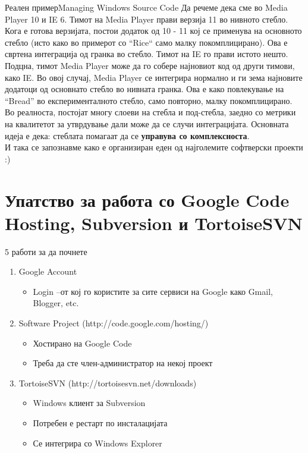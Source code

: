 \begin{frame}[shrink=10]{Реален пример}{Managing Windows Source Code}
Да речеме дека сме во Media Player 10 и IE 6. Тимот на Media Player прави
верзија 11 во нивното стебло. Кога е готова верзијата, постои додаток од 10 - 11
кој се применува на основното стебло (исто како во примерот со “Rice“ само
малку покомплицирано). Ова е свртена интеграција од гранка во стебло. Тимот на
IE го прави истото нешто.
\linebreak
Подцна, тимот Media Player може да го собере најновиот код од други тимови, како
IE. Во овој случај, Media Player се интегрира нормално и ги зема најновите
додатоци од основнато стебло во нивната гранка. Ова е како повлекување на
“Bread” во експерименталното стебло, само повторно, малку покомплицирано.
\linebreak
Во реалноста, постојат многу слоеви на стебла и под-стебла, заедно со метрики на
квалитетот за утврдување дали може да се случи интеграцијата.
Основната идеја е дека: стеблата помагаат да се \textbf{управува со
комплексноста}.\\
И така се запознавме како е организиран еден од најголемите софтверски
 проекти :)
\end{frame}

\section{Упатство за работа со Google Code Hosting, Subversion и TortoiseSVN}

\begin{frame}{5 работи за да почнете}
\begin{enumerate}
  \item Google Account 
  \begin{itemize}
    \item Login –от кој го користите за сите сервиси на Google како Gmail,
    Blogger, etc.
  \end{itemize}
  \item Software Project (http://code.google.com/hosting/) 
  \begin{itemize}
  \item Хостирано на Google Code
  \item Треба да сте член-администратор на некој проект
  \end{itemize}
  \item TortoiseSVN (http://tortoisesvn.net/downloads)
  \begin{itemize}
  \item Windows клиент за Subversion
  \item Потребен е рестарт по инсталацијата
  \item Се интегрира со Windows Explorer
  \end{itemize}
  \end{enumerate}
\end{frame}
  
